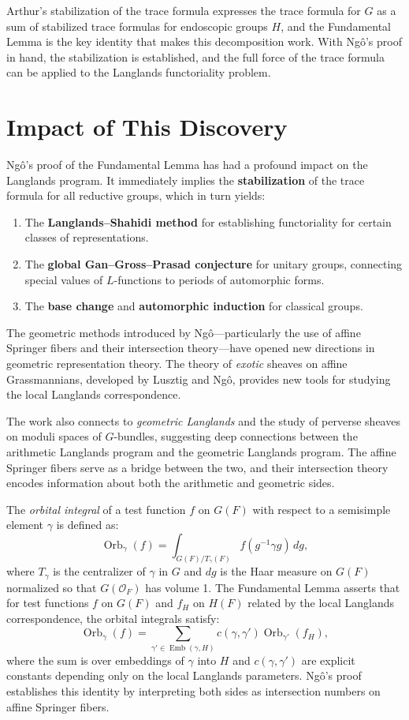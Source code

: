 Arthur's stabilization of the trace formula expresses the trace formula for $G$ as a sum of stabilized trace formulas for endoscopic groups $H$, and the Fundamental Lemma is the key identity that makes this decomposition work. With Ngô's proof in hand, the stabilization is established, and the full force of the trace formula can be applied to the Langlands functoriality problem.

\section{Impact of This Discovery}\label{ch2010ngobaochau:impact-of-this-discovery}

Ngô's proof of the Fundamental Lemma has had a profound impact on the Langlands program. It immediately implies the \textbf{stabilization} of the trace formula for all reductive groups, which in turn yields:

\begin{enumerate}
  \item The \textbf{Langlands--Shahidi method} for establishing functoriality for certain classes of representations.
  \item The \textbf{global Gan--Gross--Prasad conjecture} for unitary groups, connecting special values of $L$-functions to periods of automorphic forms.
  \item The \textbf{base change} and \textbf{automorphic induction} for classical groups.
\end{enumerate}

The geometric methods introduced by Ngô---particularly the use of affine Springer fibers and their intersection theory---have opened new directions in geometric representation theory. The theory of \emph{exotic} sheaves on affine Grassmannians, developed by Lusztig and Ngô, provides new tools for studying the local Langlands correspondence.

The work also connects to \emph{geometric Langlands} and the study of perverse sheaves on moduli spaces of $G$-bundles, suggesting deep connections between the arithmetic Langlands program and the geometric Langlands program. The affine Springer fibers serve as a bridge between the two, and their intersection theory encodes information about both the arithmetic and geometric sides.

The \emph{orbital integral} of a test function $f$ on $G(F)$ with respect to a semisimple element $\gamma$ is defined as:
\[
\operatorname{Orb}_\gamma(f) = \int_{G(F)/T_\gamma(F)} f(g^{-1} \gamma g) \, dg,
\]
where $T_\gamma$ is the centralizer of $\gamma$ in $G$ and $dg$ is the Haar measure on $G(F)$ normalized so that $G(\mathcal{O}_F)$ has volume 1. The Fundamental Lemma asserts that for test functions $f$ on $G(F)$ and $f_H$ on $H(F)$ related by the local Langlands correspondence, the orbital integrals satisfy:
\[
\operatorname{Orb}_\gamma(f) = \sum_{\gamma' \in \operatorname{Emb}(\gamma, H)} c(\gamma, \gamma') \operatorname{Orb}_{\gamma'}(f_H),
\]
where the sum is over embeddings of $\gamma$ into $H$ and $c(\gamma, \gamma')$ are explicit constants depending only on the local Langlands parameters. Ngô's proof establishes this identity by interpreting both sides as intersection numbers on affine Springer fibers.

